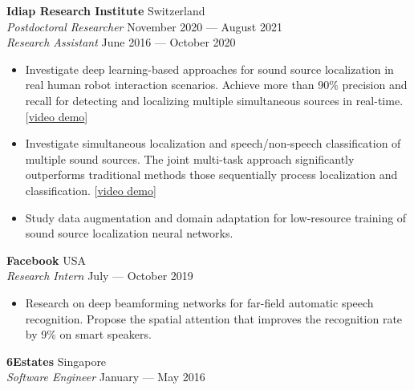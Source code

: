 \documentclass[a4paper,9pt]{extarticle} %
\begin{document}
\textbf{Idiap Research Institute}  \hfill Switzerland \\
\textit{Postdoctoral Researcher} \hfill November 2020 --- August 2021 \\
\textit{Research Assistant} \hfill June 2016 --- October 2020%
\vspace{-.9\parskip}
\begin{itemize}
  \item Investigate deep learning-based approaches for sound source localization in real human robot interaction scenarios.
        Achieve more than 90\% precision and recall for detecting and localizing multiple simultaneous sources in real-time.
        [\href{https://www.youtube.com/watch?v=_4EwuVlE_pU}{video demo}]
  \item Investigate simultaneous localization and speech/non-speech classification of multiple sound sources.
        The joint multi-task approach significantly outperforms traditional methods those sequentially process localization and classification.
        [\href{https://www.youtube.com/watch?v=O7bQvg03RTc}{video demo}]
  \item Study data augmentation and domain adaptation for low-resource training of sound source localization neural networks.
\end{itemize}


\textbf{Facebook}  \hfill USA \\
\textit{Research Intern} \hfill July --- October 2019%
\vspace{-.9\parskip}
\begin{itemize}
  \item Research on deep beamforming networks for far-field automatic speech recognition.
        Propose the spatial attention that improves the recognition rate by 9\% on smart speakers.
\end{itemize}


\textbf{6Estates}  \hfill Singapore \\
\textit{Software Engineer} \hfill January --- May 2016%
\end{document}
